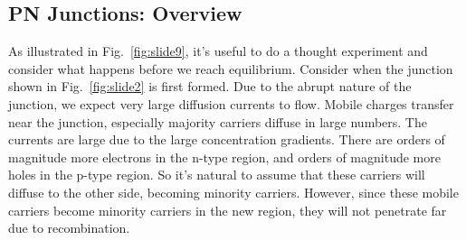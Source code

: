 \subsection{PN Junctions: Overview}
As illustrated in Fig.~\ref{fig:slide9}, it's useful to do a thought experiment and consider what happens before we reach equilibrium.  Consider when the junction shown in Fig.~\ref{fig:slide2}  is first formed.  Due to the abrupt nature of the junction, we expect very large diffusion currents to flow.   Mobile charges transfer near the junction, especially majority carriers diffuse in large numbers.  The currents are large due to the large concentration gradients.  There are orders of magnitude more electrons in the n-type region, and orders of magnitude more holes in the p-type region.  So it's natural to assume that these carriers will diffuse to the other side, becoming minority carriers.  However, since these mobile carriers become minority carriers in the new region, they will not penetrate far due to recombination.  

